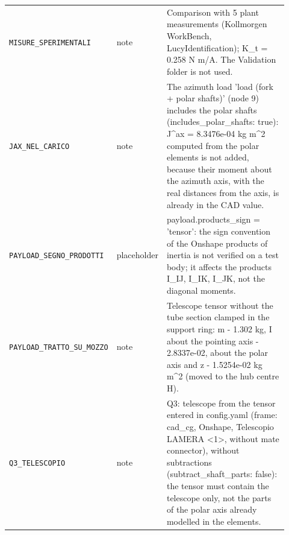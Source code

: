 \documentclass[10pt,a4paper]{article}
\numberwithin{equation}{section}
\begin{document}
\begin{longtable}{p{0.31\linewidth}p{0.12\linewidth}p{0.49\linewidth}}
\texttt{MISURE\_SPERIMENTALI} & note & Comparison with 5 plant measurements (Kollmorgen WorkBench, LucyIdentification); K\_t = 0.258 N m/A. The Validation folder is not used. \\
\texttt{JAX\_NEL\_CARICO} & note & The azimuth load 'load (fork + polar shafts)' (node 9) includes the polar shafts (includes\_polar\_shafts: true): J\^{}ax = 8.3476e-04 kg m\^{}2 computed from the polar elements is not added, because their moment about the azimuth axis, with the real distances from the axis, is already in the CAD value. \\
\texttt{PAYLOAD\_SEGNO\_PRODOTTI} & placeholder & payload.products\_sign = 'tensor': the sign convention of the Onshape products of inertia is not verified on a test body; it affects the products I\_IJ, I\_IK, I\_JK, not the diagonal moments. \\
\texttt{PAYLOAD\_TRATTO\_SU\_MOZZO} & note & Telescope tensor without the tube section clamped in the support ring: m - 1.302 kg, I about the pointing axis - 2.8337e-02, about the polar axis and z - 1.5254e-02 kg m\^{}2 (moved to the hub centre H). \\
\texttt{Q3\_TELESCOPIO} & note & Q3: telescope from the tensor entered in config.yaml (frame: cad\_cg, Onshape, Telescopio LAMERA <1>, without mate connector), without subtractions (subtract\_shaft\_parts: false): the tensor must contain the telescope only, not the parts of the polar axis already modelled in the elements. \\
\bottomrule\end{longtable}
\end{document}
